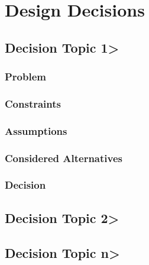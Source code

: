 \section{Design Decisions}



\subsection{Decision Topic 1>}

\subsubsection{Problem}
\subsubsection{Constraints}
\subsubsection{Assumptions}
\subsubsection{Considered Alternatives}
\subsubsection{Decision}

\subsection{Decision Topic 2>}


\subsection{Decision Topic n>}

